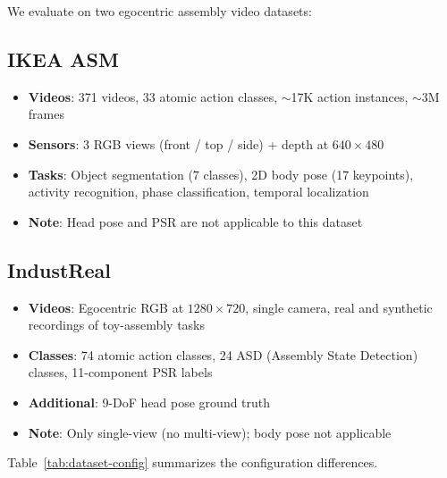 \documentclass[11pt,a4paper]{article}
\begin{document}
We evaluate on two egocentric assembly video datasets:

\subsection{IKEA ASM~\cite{benshabat2021ikea}}
\begin{itemize}
\item \textbf{Videos}: 371 videos, 33 atomic action classes, $\sim$17K action instances, $\sim$3M frames
\item \textbf{Sensors}: 3 RGB views (front / top / side) + depth at $640\times480$
\item \textbf{Tasks}: Object segmentation (7 classes), 2D body pose (17 keypoints), activity recognition, phase classification, temporal localization
\item \textbf{Note}: Head pose and PSR are not applicable to this dataset
\end{itemize}

\subsection{IndustReal~\cite{schoonbeek2024industreal}}
\begin{itemize}
\item \textbf{Videos}: Egocentric RGB at $1280\times720$, single camera, real and synthetic recordings of toy-assembly tasks
\item \textbf{Classes}: 74 atomic action classes, 24 ASD (Assembly State Detection) classes, 11-component PSR labels
\item \textbf{Additional}: 9-DoF head pose ground truth
\item \textbf{Note}: Only single-view (no multi-view); body pose not applicable
\end{itemize}

Table~\ref{tab:dataset-config} summarizes the configuration differences.
\end{document}
